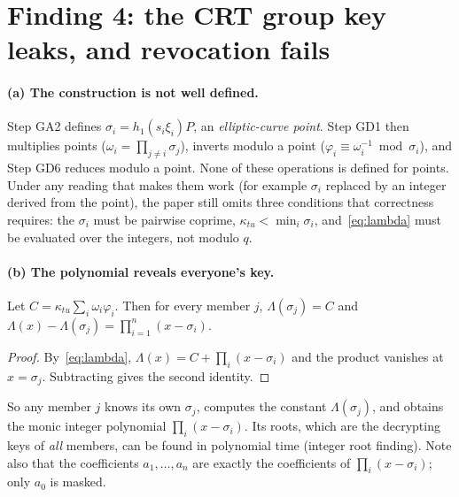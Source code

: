 \section{Finding 4: the CRT group key leaks, and revocation fails}
\paragraph{(a) The construction is not well defined.}
Step GA2 defines $\sigma_i=h_1(s_i\xi_i)P$, an \emph{elliptic-curve point}. Step GD1 then multiplies points ($\omega_i=\prod_{j\ne i}\sigma_j$), inverts
modulo a point ($\varphi_i\equiv\omega_i^{-1}\bmod\sigma_i$), and Step GD6 reduces modulo a point. None of these operations is defined for points.
Under any reading that makes them work (for example $\sigma_i$ replaced by an integer derived from the point), the paper still omits three conditions
that correctness requires: the $\sigma_i$ must be pairwise coprime, $\kappa_{tu}<\min_i\sigma_i$, and~\eqref{eq:lambda} must be evaluated over the
integers, not modulo $q$.

\paragraph{(b) The polynomial reveals everyone's key.}
\begin{lemma}\label{lem:leak}
Let $C=\kappa_{tu}\sum_i\omega_i\varphi_i$. Then for every member $j$, \;$\Lambda(\sigma_j)=C$ \;and\; $\Lambda(x)-\Lambda(\sigma_j)=\prod_{i=1}^{n}(x-\sigma_i)$.
\end{lemma}
\begin{proof}
By~\eqref{eq:lambda}, $\Lambda(x)=C+\prod_i(x-\sigma_i)$ and the product vanishes at $x=\sigma_j$. Subtracting gives the second identity.
\end{proof}
So any member $j$ knows its own $\sigma_j$, computes the constant $\Lambda(\sigma_j)$, and obtains the monic integer polynomial $\prod_i(x-\sigma_i)$.
Its roots, which are the decrypting keys of \emph{all} members, can be found in polynomial time (integer root finding). Note also that the coefficients
$a_1,\dots,a_n$ are exactly the coefficients of $\prod_i(x-\sigma_i)$; only $a_0$ is masked.

